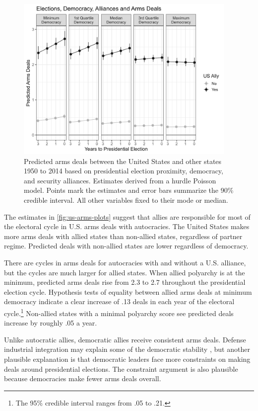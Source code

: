 \documentclass[12pt]{article}
\begin{document}
\begin{figure}[htpb]
	\centering
		\includegraphics[width=0.95\textwidth]{../figures/us-arms-plots.png}
	\caption{Predicted arms deals between the United States and other states 1950 to 2014 based on presidential election proximity, democracy, and security alliances. Estimates derived from a hurdle Poisson model. Points mark the estimates and error bars summarize the 90\% credible interval. All other variables fixed to their mode or median.}
	\label{fig:us-arms-plots}
\end{figure}


The estimates in \autoref{fig:us-arms-plots} suggest that allies are responsible for most of the electoral cycle in U.S. arms deals with autocracies. 
The United States makes more arms deals with allied states than non-allied states, regardless of partner regime. 
Predicted deals with non-allied states are lower regardless of democracy. 


There are cycles in arms deals for autocracies with and without a U.S. alliance, but the cycles are much larger for allied states. 
When allied polyarchy is at the minimum, predicted arms deals rise from 2.3 to 2.7 throughout the presidential election cycle.
Hypothesis tests of equality between allied arms deals at minimum democracy indicate a clear increase of .13 deals in each year of the electoral cycle.\footnote{The 95\% credible interval ranges from .05 to .21.}
Non-allied states with a minimal polyarchy score see predicted deals increase by roughly .05 a year.


Unlike autocratic allies, democratic allies receive consistent arms deals. 
Defense industrial integration may explain some of the democratic stability \citep{Brooks2005}, but another plausible explanation is that democratic leaders face more constraints on making deals around presidential elections.
The constraint argument is also plausible because democracies make fewer arms deals overall. 
\end{document}
